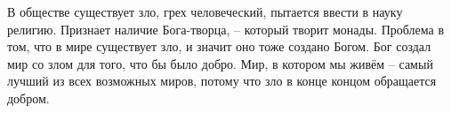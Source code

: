 В обществе существует зло, грех человеческий, пытается ввести в науку религию. Признает наличие Бога-творца, – который творит монады. Проблема в том, что в мире существует зло, и значит оно тоже создано Богом. Бог создал мир со злом для того, что бы было добро. Мир, в котором мы живём – самый лучший из всех возможных миров, потому что зло в конце концом обращается добром.
